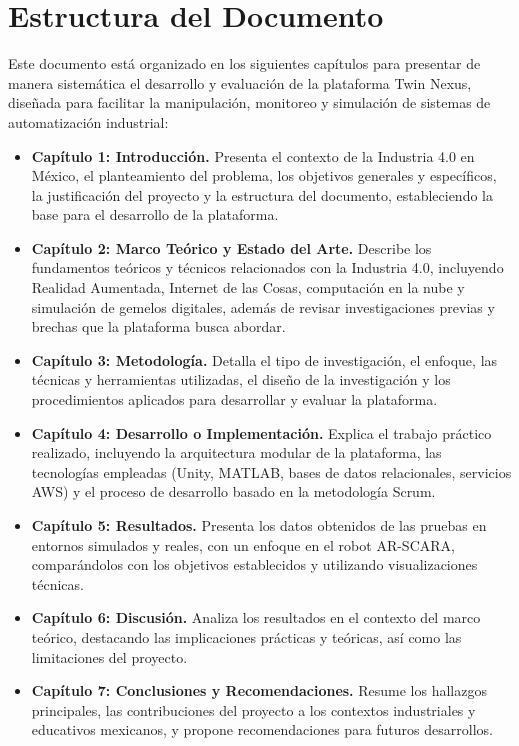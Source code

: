 \documentclass[12pt,letterpaper]{report}
\begin{document}
	\section{Estructura del Documento}
	Este documento está organizado en los siguientes capítulos para presentar de manera sistemática el desarrollo y evaluación de la plataforma Twin Nexus, diseñada para facilitar la manipulación, monitoreo y simulación de sistemas de automatización industrial:
	\begin{itemize}
		\item \textbf{Capítulo 1: Introducción.} Presenta el contexto de la Industria 4.0 en México, el planteamiento del problema, los objetivos generales y específicos, la justificación del proyecto y la estructura del documento, estableciendo la base para el desarrollo de la plataforma.
		\item \textbf{Capítulo 2: Marco Teórico y Estado del Arte.} Describe los fundamentos teóricos y técnicos relacionados con la Industria 4.0, incluyendo Realidad Aumentada, Internet de las Cosas, computación en la nube y simulación de gemelos digitales, además de revisar investigaciones previas y brechas que la plataforma busca abordar.
		\item \textbf{Capítulo 3: Metodología.} Detalla el tipo de investigación, el enfoque, las técnicas y herramientas utilizadas, el diseño de la investigación y los procedimientos aplicados para desarrollar y evaluar la plataforma.
		\item \textbf{Capítulo 4: Desarrollo o Implementación.} Explica el trabajo práctico realizado, incluyendo la arquitectura modular de la plataforma, las tecnologías empleadas (Unity, MATLAB, bases de datos relacionales, servicios AWS) y el proceso de desarrollo basado en la metodología Scrum.
		\item \textbf{Capítulo 5: Resultados.} Presenta los datos obtenidos de las pruebas en entornos simulados y reales, con un enfoque en el robot AR-SCARA, comparándolos con los objetivos establecidos y utilizando visualizaciones técnicas.
		\item \textbf{Capítulo 6: Discusión.} Analiza los resultados en el contexto del marco teórico, destacando las implicaciones prácticas y teóricas, así como las limitaciones del proyecto.
		\item \textbf{Capítulo 7: Conclusiones y Recomendaciones.} Resume los hallazgos principales, las contribuciones del proyecto a los contextos industriales y educativos mexicanos, y propone recomendaciones para futuros desarrollos.
	\end{itemize}
	
\end{document}
